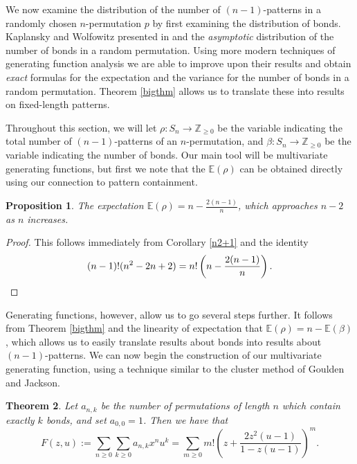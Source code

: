 \documentclass[11pt]{article}
\theoremstyle{plain}
\newtheorem{thm}{Theorem}
\newtheorem{prop}[thm]{Proposition}
\theoremstyle{definition}
\newcommand{\Ex}{\mathbb{E}(\beta)}
\newcommand{\Em}{\mathbb{E}(\rho)}
\newcommand{\dsum}{\sum_{n\geq 0} \sum_{k\geq 0}}
\begin{document}
  We now examine the distribution of the number of $(n-1)$-patterns in a
  randomly chosen $n$-permutation $p$ by first examining the distribution of
  bonds. Kaplansky and Wolfowitz presented in \cite{kap} and \cite{wolf} the
  \emph{asymptotic} distribution of the number of bonds in a random permutation.
  Using more modern techniques of generating function analysis we are able to
  improve upon their results and obtain \emph{exact} formulas for the
  expectation and the variance for the number of bonds in a random permutation.
  Theorem \ref{bigthm} allows us to translate these into results on fixed-length
  patterns.


  Throughout this section, we will let $\rho:S_n \rightarrow \mathbb{Z}_{\geq
  0}$ be the variable indicating the total number of $(n-1)$-patterns of an
  $n$-permutation, and $\beta:S_n \rightarrow \mathbb{Z}_{\geq 0}$ be the variable
  indicating the number of bonds. Our main tool will be multivariate generating
  functions, but first we note that the $\Em$ can be obtained directly using our
  connection to pattern containment.

  \begin{prop} \label{expect}
  The expectation $\Em =n -  \frac{2(n-1)}{n}$, which approaches $n-2$ as $n$
  increases.  
  \end{prop}
  \begin{proof}
  This follows immediately from Corollary \ref{n2+1} and the identity
  $$(n-1)!(n^2-2n+2) = n!\left(n-\frac{2(n-1)}{n}\right).\qedhere $$ 
  \end{proof}



  Generating functions, however, allow us to go several steps further. It follows
  from Theorem \ref{bigthm} and the linearity of expectation that $\Em = n - \Ex$,
  which allows us to easily translate results about bonds into results about
  $(n-1)$-patterns. We can now begin the construction of our multivariate
  generating function, using a technique similar to the cluster method of Goulden and
  Jackson. 




  \begin{thm} \label{genfcn} 
  Let $a_{n,k}$ be the number of permutations of length $n$ which contain exactly
  $k$ bonds, and set $a_{0,0} = 1$. Then we have that $$F(z,u) := \dsum a_{n,k}
  x^n u^k = \sum_{m\geq 0} m!\left(z+\frac{2z^2(u-1)}{1-z(u-1)}\right)^m.$$
  \end{thm}
\end{document}
